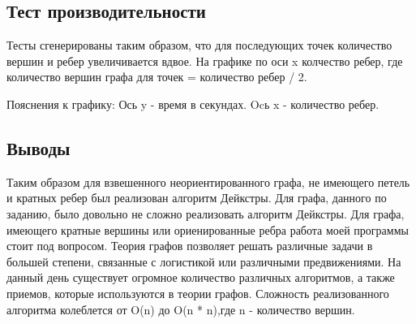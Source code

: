 \documentclass[12pt]{article}
\begin{document}
\subsection*{Тест производительности}
Тесты сгенерированы таким образом, что для последующих точек количество вершин и ребер увеличивается вдвое. На графике по оси x колчество ребер, где количество вершин графа для точек  = количество ребер / 2. \newline \newline
{}
\newline
Пояснения к графику:
Ось y - время в секундах. Ocь x - количество ребер.
\subsection*{Выводы}
Таким образом для взвешенного неориентированного графа, не имеющего петель и кратных ребер был реализован алгоритм Дейкстры. Для графа, данного по заданию, было довольно не сложно реализовать алгоритм Дейкстры. Для графа, имеющего кратные вершины или ориенированные ребра работа моей программы стоит под вопросом. Теория графов позволяет решать различные задачи в большей степени, связанные с логистикой или различными предвижениями. На данный день существует огромное количество различных алгоритмов, а также приемов, которые используются в теории графов. Сложность реализованного алгоритма колеблется от O(n) до O(n * n),где n - количество вершин.
\end{document}
